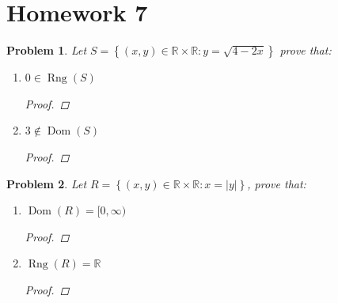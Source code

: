\documentclass[12pt]{article}
\DeclareMathOperator{\rng}{Rng}
\DeclareMathOperator{\dom}{Dom}
\newcommand{\R}{\mathbb R}
\newcommand{\set}[1]{\left\{ #1 \right\}}
\newtheorem{problem}{Problem}
\begin{document}
 
%

\rhead{\today}
 

\section*{Homework 7}
\begin{problem} Let $S=\set{(x,y)\in \R \times \R: y=\sqrt{4-2x}}$ prove that: 
\begin{enumerate}
\item $0\in \rng(S)$
\begin{proof} 

\end{proof}
\item $3\not\in \dom(S)$ 
\begin{proof} 

\end{proof}
\end{enumerate}

\end{problem}
 

\begin{problem} 
Let $R=\set{(x,y)\in \mathbb R \times \mathbb R: x=|y|} $, prove that:
\begin{enumerate}
\item $\dom(R)=[0,\infty)$ 
\begin{proof} 

\end{proof}
\item $\rng(R)=\R$ 
\begin{proof} 

\end{proof}
\end{enumerate}
\end{problem}
\end{document}
